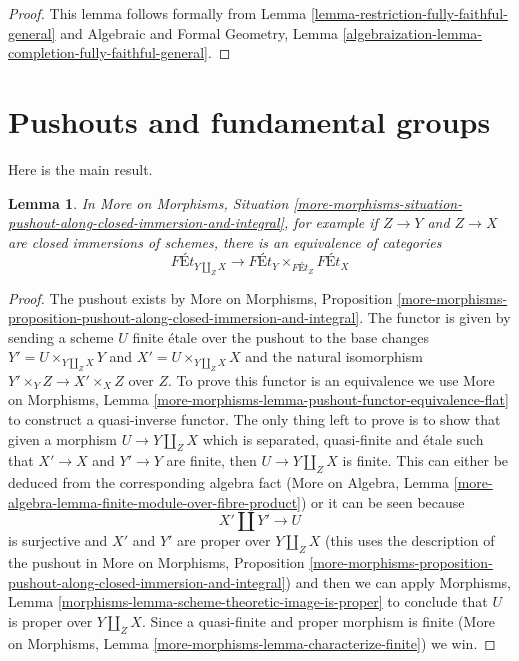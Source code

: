 \documentclass{stacks-project}
\theoremstyle{plain}
\newtheorem{lemma}[subsection]{Lemma}
\theoremstyle{definition}
\theoremstyle{remark}
\numberwithin{equation}{subsection}
\begin{document}
\begin{proof}
This lemma follows formally from
Lemma \ref{lemma-restriction-fully-faithful-general} and
Algebraic and Formal Geometry, Lemma
\ref{algebraization-lemma-completion-fully-faithful-general}.
\end{proof}






\section{Pushouts and fundamental groups}
\label{section-pushouts}

\noindent
Here is the main result.

\begin{lemma}
\label{lemma-pushout-along-closed-immersion-and-integral}
In More on Morphisms, Situation
\ref{more-morphisms-situation-pushout-along-closed-immersion-and-integral},
for example if $Z \to Y$ and $Z \to X$ are closed immersions of schemes,
there is an equivalence of categories
$$
\textit{F\'Et}_{Y \amalg_Z X}
\longrightarrow
\textit{F\'Et}_Y
\times_{\textit{F\'Et}_Z}
\textit{F\'Et}_X
$$
\end{lemma}

\begin{proof}
The pushout exists by
More on Morphisms, Proposition
\ref{more-morphisms-proposition-pushout-along-closed-immersion-and-integral}.
The functor is given by sending a scheme $U$ finite \'etale over the
pushout to the base changes $Y' = U \times_{Y \amalg_Z X} Y$
and $X' = U \times_{Y \amalg_Z X} X$ and the natural isomorphism
$Y' \times_Y Z \to X' \times_X Z$ over $Z$. To prove this functor
is an equivalence we use
More on Morphisms, Lemma
\ref{more-morphisms-lemma-pushout-functor-equivalence-flat}
to construct a quasi-inverse functor.
The only thing left to prove is to show that given a morphism
$U \to Y \amalg_Z X$ which is separated, quasi-finite and \'etale
such that $X' \to X$ and $Y' \to Y$ are finite,
then $U \to Y \amalg_Z X$ is finite.
This can either be deduced from the corresponding algebra fact
(More on Algebra, Lemma
\ref{more-algebra-lemma-finite-module-over-fibre-product})
or it can be seen because
$$
X' \amalg Y' \to U
$$
is surjective and $X'$ and $Y'$ are proper over $Y \amalg_Z X$
(this uses the description of the pushout in More on Morphisms, Proposition
\ref{more-morphisms-proposition-pushout-along-closed-immersion-and-integral})
and then we can apply
Morphisms, Lemma \ref{morphisms-lemma-scheme-theoretic-image-is-proper}
to conclude that $U$ is proper over $Y \amalg_Z X$.
Since a quasi-finite and proper morphism is finite
(More on Morphisms, Lemma \ref{more-morphisms-lemma-characterize-finite})
we win.
\end{proof}
\end{document}
